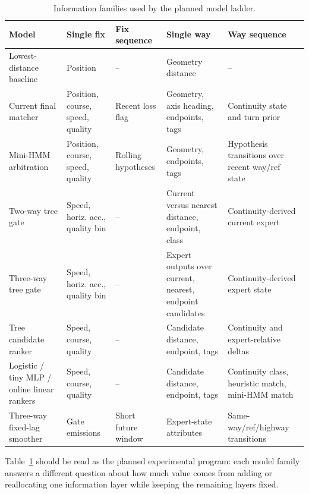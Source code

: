 \documentclass{article}
\begin{document}
\begin{table}[!htbp]
\centering
\caption{Information families used by the planned model ladder.}
\label{tab:model_information_matrix}
\scriptsize
\setlength{\tabcolsep}{3.5pt}
\renewcommand{\arraystretch}{1.05}
\begin{tabular}{>{\raggedright\arraybackslash}p{2.9cm}>{\raggedright\arraybackslash}p{1.8cm}>{\raggedright\arraybackslash}p{1.7cm}>{\raggedright\arraybackslash}p{2.35cm}>{\raggedright\arraybackslash}p{2.45cm}}
\toprule
Model & Single fix & Fix sequence & Single way & Way sequence \\
\midrule
Lowest-distance baseline & Position & -- & Geometry distance & -- \\
Current final matcher & Position, course, speed, quality & Recent loss flag & Geometry, axis heading, endpoints, tags & Continuity state and turn prior \\
Mini-HMM arbitration & Position, course, speed, quality & Rolling hypotheses & Geometry, endpoints, tags & Hypothesis transitions over recent way/ref state \\
Two-way tree gate & Speed, horiz. acc., quality bin & -- & Current versus nearest distance, endpoint, class & Continuity-derived current expert \\
Three-way tree gate & Speed, horiz. acc., quality bin & -- & Expert outputs over current, nearest, endpoint candidates & Continuity-derived expert state \\
Tree candidate ranker & Speed, course, quality & -- & Candidate distance, endpoint, tags & Continuity and expert-relative deltas \\
Logistic / tiny MLP / online linear rankers & Speed, course, quality & -- & Candidate distance, endpoint, tags & Continuity class, heuristic match, mini-HMM match \\
Three-way fixed-lag smoother & Gate emissions & Short future window & Expert-state attributes & Same-way/ref/highway transitions \\
\bottomrule
\end{tabular}
\end{table}

Table~\ref{tab:model_information_matrix} should be read as the planned experimental program: each model family answers a different question about how much value comes from adding or reallocating one information layer while keeping the remaining layers fixed.
\end{document}

